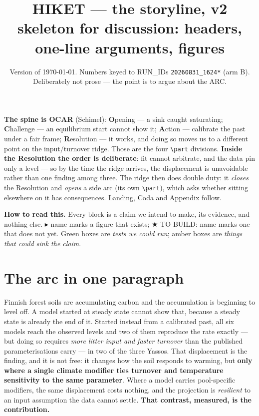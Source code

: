 \documentclass[11pt]{article}
\title{\vspace{-1.4cm}\textbf{HIKET --- the storyline, v2}\\[2pt]
\large skeleton for discussion: headers, one-line arguments, figures}
\author{}
\date{\small Version of \today. Numbers keyed to RUN\_IDs \texttt{20260831\_1624*} (arm B).
Deliberately not prose --- the point is to argue about the ARC.}
\newcommand{\FIGX}[1]{\textcolor{noterule}{\small$\blacktriangleright$ \textsf{#1}}}
\newcommand{\NEW}[1]{\textcolor{testrule}{\small$\bigstar$ \textsf{TO BUILD: #1}}}
\begin{document}
\maketitle

\begin{note}
\textbf{The spine is OCAR} (Schimel): \textbf{O}pening --- a sink caught saturating;
\textbf{C}hallenge --- an equilibrium start cannot show it; \textbf{A}ction --- calibrate the past
under a fair frame; \textbf{R}esolution --- it works, and doing so moves us to a different point on
the input/turnover ridge. Those are the four \texttt{\textbackslash part} divisions.
\textbf{Inside the Resolution the order is deliberate}: fit cannot arbitrate, and the data pin only a
level --- so by the time the ridge arrives, the displacement is unavoidable rather than one finding
among three. The ridge then does double duty: it \emph{closes} the Resolution and \emph{opens} a side
arc (its own \texttt{\textbackslash part}), which asks whether sitting elsewhere on it has
consequences. Landing, Coda and Appendix follow.
\end{note}

\begin{note}
\textbf{How to read this.} Every block is a claim we intend to make, its evidence, and nothing
else. \FIGX{name} marks a figure that exists; \NEW{name} marks one that does not yet.
Green boxes are \emph{tests we could run}; amber boxes are \emph{things that could sink the claim}.
\end{note}

\tableofcontents
\bigskip

\section{The arc in one paragraph}
Finnish forest soils are accumulating carbon and the accumulation is beginning to level off. A model
started at steady state cannot show that, because a steady state is already the end of it. Started
instead from a calibrated past, all six models reach the observed levels and two of them reproduce
the rate exactly --- but doing so requires \emph{more litter input and faster turnover} than the
published parameterisations carry --- in two of the three Yassos. That displacement is the finding,
and it is not free: it changes how the soil responds to warming, but \textbf{only where a single
climate modifier ties turnover and temperature sensitivity to the same parameter}. Where a model
carries pool-specific modifiers, the same displacement costs nothing, and the projection is
\emph{resilient} to an input assumption the data cannot settle. \textbf{That contrast, measured, is
the contribution.}
\end{document}
